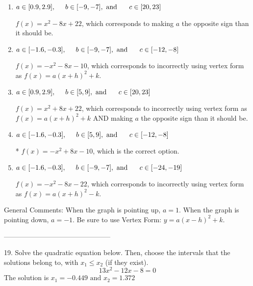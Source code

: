 \documentclass{extbook}[14pt]
\begin{document}
\begin{enumerate}[label=\Alph*.] 
\item $ a \in [0.9, 2.9], \hspace*{5mm} b \in [-9, -7], \text{ and } \hspace*{5mm} c \in [20, 23] $ 

 $f(x)=x^{2} -8 x + 22$, which corresponds to making $a$ the opposite sign than it should be. 
\item $ a \in [-1.6, -0.3], \hspace*{5mm} b \in [-9, -7], \text{ and } \hspace*{5mm} c \in [-12, -8] $ 

 $f(x)=-x^{2} -8 x -10$, which corresponds to incorrectly using vertex form as $f(x) = a(x+h)^2+k$. 
\item $ a \in [0.9, 2.9], \hspace*{5mm} b \in [5, 9], \text{ and } \hspace*{5mm} c \in [20, 23] $ 

 $f(x)=x^{2} +8 x + 22$, which corresponds to incorrectly using vertex form as $f(x) = a(x+h)^2+k$ AND making $a$ the opposite sign than it should be. 
\item $ a \in [-1.6, -0.3], \hspace*{5mm} b \in [5, 9], \text{ and } \hspace*{5mm} c \in [-12, -8] $ 

 * $f(x)=-x^{2} +8 x -10$, which is the correct option. 
\item $ a \in [-1.6, -0.3], \hspace*{5mm} b \in [-9, -7], \text{ and } \hspace*{5mm} c \in [-24, -19] $ 

 $f(x)=-x^{2} -8 x -22$, which corresponds to incorrectly using vertex form as $f(x) = a(x+h)^2 - k$. 
\end{enumerate} 
 
General Comments: When the graph is pointing up, $a=1$. When the graph is pointing down, $a=-1$. Be sure to use Vertex Form: $y = a(x-h)^2+k$.

-----------------------------------------------

19. Solve the quadratic equation below. Then, choose the intervals that the solutions belong to, with $x_1 \leq x_2$ (if they exist).
\[ 13x^{2} -12 x -8 = 0 \] 
The solution is $ x_1 = -0.449 \text{ and } x_2 = 1.372 $ 
\end{document}
